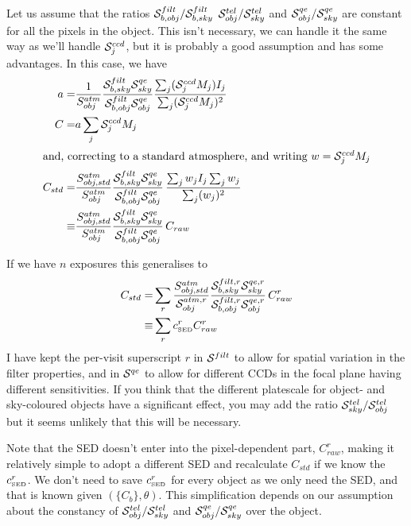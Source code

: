 \documentclass[12pt]{article}
\newcommand{\qe}{{\cal S}}
\begin{document}
Let us assume that the ratios  $\qe_{b, obj}^{filt}/\qe_{b, sky}^{filt}$ 
$\qe_{obj}^{tel}/\qe_{sky}^{tel}$ and $\qe_{obj}^{qe}/\qe_{sky}^{qe}$ are
constant for all the pixels in the object.  This isn't necessary, we can handle it the same way as we'll
handle $\qe_j^{ccd}$, but it is probably a good assumption and has some advantages.  In this case, we have
\begin{align*}
  a =& \frac{1}{S_{obj}^{atm}} \frac{\qe_{b, sky}^{filt} \qe_{sky}^{qe}}
                                    {\qe_{b, obj}^{filt} \qe_{obj}^{qe}}
                         \frac{\sum_j (\qe_j^{ccd} M_j) I_j}{\sum_j (\qe_j^{ccd} M_j)^2}\\
C =& a \sum_j \qe_j^{ccd} M_j\\
\intertext{and, correcting to a standard atmosphere, and writing $w = \qe_j^{ccd} M_j$}
C_{std} =& \frac{S_{obj,std}^{atm}}{S_{obj}^{atm}}
                  \frac{\qe_{b, sky}^{filt} \qe_{sky}^{qe}}
                       {\qe_{b, obj}^{filt} \qe_{obj}^{qe}}
                         \, \frac{\sum_j w_j I_j  \sum_j w_j}{\sum_j (w_j)^2} \\
\equiv& \frac{S_{obj,std}^{atm}}{S_{obj}^{atm}}
                  \frac{\qe_{b, sky}^{filt} \qe_{sky}^{qe}}
                       {\qe_{b, obj}^{filt} \qe_{obj}^{qe}}
                         \, C_{raw}
\end{align*}

\newcommand{\cSED}{c_{\scriptscriptstyle\rm SED}}

If we have $n$ exposures this generalises to
\begin{align*}
C_{std}  =& \sum_r
    \frac{S_{obj,std}^{atm}}{\qe_{obj}^{atm,r}}
    \frac{\qe_{b, sky}^{filt,r} \qe_{sky}^{qe,r}}
         {\qe_{b, obj}^{filt,r} \qe_{obj}^{qe,r}}
    \, C_{raw}^r\\
 \equiv& \sum_r \cSED^r C_{raw}^r
\end{align*}
I have kept the per-visit superscript $r$ in $\qe^{filt}$ to allow for spatial variation in the filter
properties, and in $\qe^{qe}$ to allow for different CCDs in the focal plane having different sensitivities.
If you think that the different platescale for object- and sky-coloured objects have a significant effect, you
may add the ratio $\qe_{sky}^{tel}/\qe_{obj}^{tel}$ but it seems unlikely that this will be necessary.

Note that the SED doesn't enter into the pixel-dependent part, $C_{raw}^r$, making it relatively simple to
adopt a different SED and recalculate $C_{std}$ if we know the $\cSED^r$.  We don't need to save $\cSED^r$
for every object as we only need the SED, and that is known given $(\{C_b\}, \theta)$.  This simplification
depends on our assumption about the constancy of  $\qe_{obj}^{tel}/\qe_{sky}^{tel}$ and
$\qe_{obj}^{qe}/\qe_{sky}^{qe}$ over the object.
\end{document}
